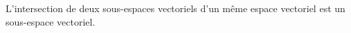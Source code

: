 L'intersection de deux sous-espaces vectoriels d'un même espace vectoriel est un sous-espace vectoriel.

\begin{reponses}
\end{reponses}

